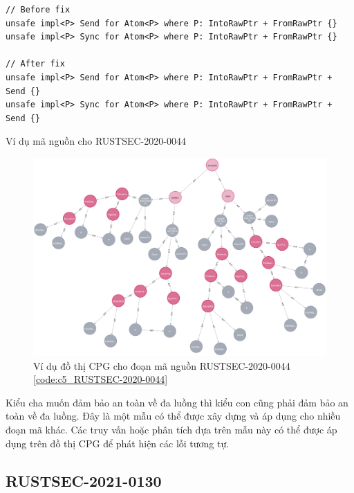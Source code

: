 \begin{listing}[H]
\begin{verbatim}
// Before fix
unsafe impl<P> Send for Atom<P> where P: IntoRawPtr + FromRawPtr {}
unsafe impl<P> Sync for Atom<P> where P: IntoRawPtr + FromRawPtr {}

// After fix
unsafe impl<P> Send for Atom<P> where P: IntoRawPtr + FromRawPtr + Send {}
unsafe impl<P> Sync for Atom<P> where P: IntoRawPtr + FromRawPtr + Send {}
\end{verbatim}
\caption{Ví dụ mã nguồn cho RUSTSEC-2020-0044}
\label{code:c5_RUSTSEC-2020-0044}
\end{listing}

\begin{figure}[H]
    \includegraphics[width=1\columnwidth]{figures/c5/c5_RUSTSEC-2020-0044.png}
    \centering
    \caption{Ví dụ đồ thị CPG cho đoạn mã nguồn RUSTSEC-2020-0044 \ref{code:c5_RUSTSEC-2020-0044}}
    \label{img:c5_RUSTSEC-2020-0044}
\end{figure}

Kiểu cha muốn đảm bảo an toàn về đa luồng thì kiểu con cũng phải đảm bảo an toàn về đa luồng.
Đây là một mẫu có thể được xây dựng và áp dụng cho nhiều đoạn mã khác.
Các truy vấn hoặc phân tích dựa trên mẫu này có thể được áp dụng trên đồ thị CPG để phát hiện các lỗi tương tự.

\subsection{RUSTSEC-2021-0130}

